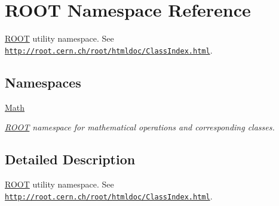 \hypertarget{namespace_r_o_o_t}{}\section{R\+O\+OT Namespace Reference}
\label{namespace_r_o_o_t}


\hyperlink{namespace_r_o_o_t}{R\+O\+OT} utility namespace. See \href{http://root.cern.ch/root/htmldoc/ClassIndex.html}{\tt http\+://root.\+cern.\+ch/root/htmldoc/\+Class\+Index.\+html}.  


\subsection*{Namespaces}
\begin{DoxyCompactItemize}
\item 
 \hyperlink{namespace_r_o_o_t_1_1_math}{Math}
\begin{DoxyCompactList}\small\item\em \hyperlink{namespace_r_o_o_t}{R\+O\+OT} namespace for mathematical operations and corresponding classes. \end{DoxyCompactList}\end{DoxyCompactItemize}


\subsection{Detailed Description}
\hyperlink{namespace_r_o_o_t}{R\+O\+OT} utility namespace. See \href{http://root.cern.ch/root/htmldoc/ClassIndex.html}{\tt http\+://root.\+cern.\+ch/root/htmldoc/\+Class\+Index.\+html}. 